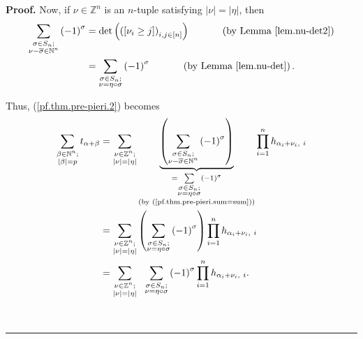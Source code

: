 \documentclass
[numbers=enddot,12pt,final,onecolumn,notitlepage,english]{scrartcl}%
\theoremstyle{definition}
\newenvironment{proof}[1][Proof]{\noindent\textbf{#1.} }{\ \rule{0.5em}{0.5em}}
\let\sumnonlimits\sum
\let\prodnonlimits\prod
\renewcommand{\sum}{\sumnonlimits\limits}
\renewcommand{\prod}{\prodnonlimits\limits}
\newenvironment{verlong}{}{}
\begin{document}
\begin{verlong}
\begin{proof}
Now, if $\nu\in\mathbb{Z}^{n}$ is an $n$-tuple satisfying $\left\vert
\nu\right\vert =\left\vert \eta\right\vert $, then%
\begin{align}
\sum_{\substack{\sigma\in S_{n};\\\nu-\overline{\sigma}\in\mathbb{N}^{n}%
}}\left(  -1\right)  ^{\sigma}  &  =\det\left(  \left(  \left[  \nu_{i}\geq
j\right]  \right)  _{i,j\in\left[  n\right]  }\right)
\ \ \ \ \ \ \ \ \ \ \left(  \text{by Lemma \ref{lem.nu-det2}}\right)
\nonumber\\
&  =\sum_{\substack{\sigma\in S_{n};\\\nu=\eta\circ\sigma}}\left(  -1\right)
^{\sigma}\ \ \ \ \ \ \ \ \ \ \left(  \text{by Lemma \ref{lem.nu-det}}\right)
. \label{pf.thm.pre-pieri.sum=sum}%
\end{align}


Thus, (\ref{pf.thm.pre-pieri.2}) becomes%
\begin{align}
\sum_{\substack{\beta\in\mathbb{N}^{n};\\\left\vert \beta\right\vert
=p}}t_{\alpha+\beta}  &  =\sum_{\substack{\nu\in\mathbb{Z}^{n};\\\left\vert
\nu\right\vert =\left\vert \eta\right\vert }}\underbrace{\left(
\sum_{\substack{\sigma\in S_{n};\\\nu-\overline{\sigma}\in\mathbb{N}^{n}%
}}\left(  -1\right)  ^{\sigma}\right)  }_{\substack{=\sum_{\substack{\sigma\in
S_{n};\\\nu=\eta\circ\sigma}}\left(  -1\right)  ^{\sigma}\\\text{(by
(\ref{pf.thm.pre-pieri.sum=sum}))}}}\prod_{i=1}^{n}h_{\alpha_{i}+\nu_{i}%
,\ i}\nonumber\\
&  =\sum_{\substack{\nu\in\mathbb{Z}^{n};\\\left\vert \nu\right\vert
=\left\vert \eta\right\vert }}\left(  \sum_{\substack{\sigma\in S_{n}%
;\\\nu=\eta\circ\sigma}}\left(  -1\right)  ^{\sigma}\right)  \prod_{i=1}%
^{n}h_{\alpha_{i}+\nu_{i},\ i}\nonumber\\
&  =\sum_{\substack{\nu\in\mathbb{Z}^{n};\\\left\vert \nu\right\vert
=\left\vert \eta\right\vert }}\ \ \sum_{\substack{\sigma\in S_{n};\\\nu
=\eta\circ\sigma}}\left(  -1\right)  ^{\sigma}\prod_{i=1}^{n}h_{\alpha_{i}%
+\nu_{i},\ i}. \label{pf.thm.pre-pieri.2b}%
\end{align}



\end{proof}
\end{verlong}
\end{document}
